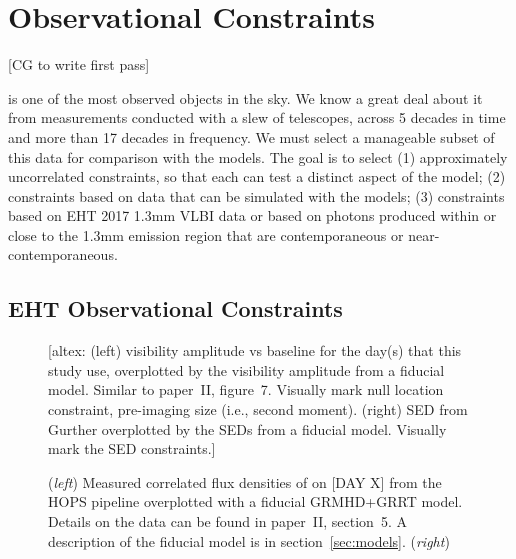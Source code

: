 \section{Observational Constraints}\label{sec:observations}

[CG to write first pass]

\sgra is one of the most observed objects in the sky.
We know a great deal about it from measurements conducted with a slew
of telescopes, across 5 decades in time and more than 17 decades in
frequency.
We must select a manageable subset of this data for comparison with
the models.
The goal is to select (1) approximately uncorrelated constraints, so
that each can test a distinct aspect of the model; (2) constraints
based on data that can be simulated with the models; (3) constraints
based on EHT 2017 1.3mm VLBI data or based on photons produced within
or close to the 1.3mm emission region that are contemporaneous or
near-contemporaneous.


\subsection{EHT Observational Constraints}


\begin{figure*}
  \centering
  [altex: (left) visibility amplitude vs baseline for the day(s) that
    this study use, overplotted by the visibility amplitude from a
    fiducial model.
    Similar to paper~II, figure~7.
    Visually mark null location constraint, pre-imaging size (i.e.,
    second moment).
    (right) SED from Gurther overplotted by the SEDs from a fiducial
    model.
    Visually mark the SED constraints.]
  \caption{(\emph{left}) Measured correlated flux densities of \sgra
    on [DAY X] from the HOPS pipeline overplotted with a fiducial
    GRMHD+GRRT model.
    Details on the data can be found in paper~II, section~5.
    A description of the fiducial model is in
    section~\ref{sec:models}.
    (\emph{right}) }
  \label{fig:visibility}
\end{figure*}

